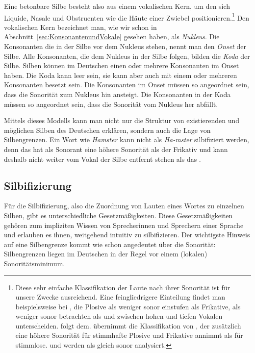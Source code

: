 Eine betonbare Silbe besteht also aus einem vokalischen Kern, um den sich Liquide, Nasale und Obstruenten wie die Häute einer Zwiebel positionieren.\footnote{Diese sehr einfache Klassifikation der Laute nach ihrer Sonorität ist für unsere Zwecke ausreichend. Eine feingliedrigere Einteilung findet man beispielsweise bei \citet[132]{RamersVater1991}, die Plosive als weniger sonor einstufen als Frikative, \textipa{[l]} als weniger sonor betrachten als \textipa{[K]} und zwischen hohen und tiefen Vokalen unterscheiden. \citet[72]{Wiese2011} folgt dem. \citet[61]{NoackPhonologie2016} übernimmt die Klassifikation von \citet{Jespersen1904}, der zusätzlich eine höhere So\-norität für stimmhafte Plosive und Frikative annimmt als für stimmlose. \textipa{[l]} und \textipa{[K]} werden als gleich sonor analysiert.} Den vokalischen Kern bezeichnet man, wie wir schon in Abschnitt~\ref{sec:KonsonantenundVokale} gesehen haben, als \textit{Nukleus}. Die Konsonanten die in der Silbe vor dem Nukleus stehen, nennt man den \textit{Onset} der Silbe. Alle Konsonanten, die dem Nukleus in der Silbe folgen, bilden die \textit{Koda} der Silbe. Silben können im Deutschen einen oder mehrere Konsonanten im Onset haben. Die Koda kann leer sein, sie kann aber auch mit einem oder mehreren Konsonanten besetzt sein. Die Konsonanten im Onset müssen so angeordnet sein, dass die Sonorität zum Nukleus hin ansteigt. Die Konsonanten in der Koda müssen so angeordnet sein, dass die Sonorität vom Nukleus her abfällt.

Mittels dieses Modells kann man nicht nur die Struktur von existierenden und möglichen Silben des Deutschen erklären, sondern auch die Lage von Silbengrenzen. Ein Wort wie \textit{Hamster} kann nicht als \textit{Ha-mster} silbifiziert werden, denn das \textipa{[m]} hat als Sonorant eine höhere Sonorität als der Frikativ \textipa{[s]} und kann deshalb nicht weiter vom Vokal der Silbe entfernt stehen als das \textipa{[s]}.


\subsection{Silbifizierung}\label{subsec:Silbifizierung}

Für die Silbifizierung, also die Zuordnung von Lauten eines Wortes zu einzelnen Silben, gibt es unterschiedliche Gesetzmäßigkeiten. Diese Gesetzmäßigkeiten gehören zum impliziten Wissen von Sprecherinnen und Sprechern einer Sprache und erlauben es ihnen, weitgehend intuitiv zu silbifizieren. Der wichtigste Hinweis auf eine Silbengrenze kommt wie schon angedeutet über die Sonorität: Silbengrenzen liegen im Deutschen in der Regel vor einem (lokalen) Sonoritätsminimum. 

